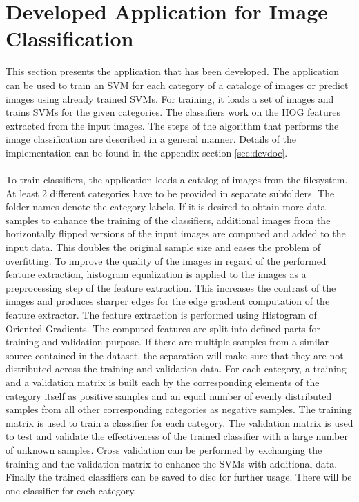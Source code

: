 
\section{Developed Application for Image Classification}\label{sec:application}

This section presents the application that has been developed. The application can be used to train an SVM for each category of a cataloge of images or predict images using already trained SVMs. For training, it loads a set of images and trains SVMs for the given categories. The classifiers work on the HOG features extracted from the input images. The steps of the algorithm that performs the image classification are described in a general manner. Details of the implementation can be found in the appendix section \ref{sec:devdoc}.
\\
\\
To train classifiers, the application loads a catalog of images from the filesystem. At least 2 different categories have to be provided in separate subfolders. The folder names denote the category labels. If it is desired to obtain more data samples to enhance the training of the classifiers, additional images from the horizontally flipped versions of the input images are computed and added to the input data. This doubles the original sample size and eases the problem of overfitting. To improve the quality of the images in regard of the performed feature extraction, histogram equalization is applied to the images as a preprocessing step of the feature extraction. This increases the contrast of the images and produces sharper edges for the edge gradient computation of the feature extractor. The feature extraction is performed using Histogram of Oriented Gradients. The computed features are split into defined parts for training and validation purpose. If there are multiple samples from a similar source contained in the dataset, the separation will make sure that they are not distributed across the training and validation data. For each category, a training and a validation matrix is built each by the corresponding elements of the category itself as positive samples and an equal number of evenly distributed samples from all other corresponding categories as negative samples. The training matrix is used to train a classifier for each category. The validation matrix is used to test and validate the effectiveness of the trained classifier with a large number of unknown samples. Cross validation can be performed by exchanging the training and the validation matrix to enhance the SVMs with additional data. Finally the trained classifiers can be saved to disc for further usage. There will be one classifier for each category.
